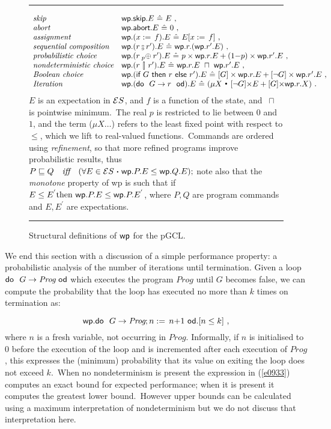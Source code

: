 \documentclass[numbers,copyright,creativecommons]{eptcs}
\newcommand{\Eqn}[1]{(\ref{#1})}
\newenvironment{Fig}{\begin{figure}[h]\small\rule{\textwidth}{.02cm}}{\rule{\textwidth}{.02cm}\end{figure}}
\newcommand{\st}{~{\scriptscriptstyle ^\bullet}~}
\newcommand{\Lift}[1]{[{#1}]}
\newcommand{\define}{~ \hat{=} ~}
\newcommand{\EE}[1]{ {\cal E}{#1}}
\newcommand{\Gets}{:=\,}
\newcommand{\PC}[1]{\mathbin{\makebox[0em]{~}_{#1}\oplus}}
\newcommand{\Ch}{\ [\!] \ }
\newcommand{\Abort}{\mbox{\sf abort}}
\newcommand{\Skip}{\mbox{\sf skip}}
\newcommand{\If}{\mbox{\sf if\ }}
\newcommand{\Thn}{\mbox{\sf \ then\ }}
\newcommand{\Els}{\mbox{\sf \ else\ }}
\newcommand{\Do}{\mbox{\sf do\ }}
\newcommand{\Od}{\mbox{\sf \ od}}
\newcommand{\Wp}{\mbox{\sf wp}}
\newcommand{\DWp}{\mbox{\sf wp}}
\newcommand{\Min}{~\sqcap~}
\newcommand{\pGCL}{\mbox{pGCL}}
\newcommand{\Prog}{\textit{Prog}}
\newcommand{\CompNY}[3]{(#1#2 \Spot #3)}
\newcommand{\Spot}{\mathrel{\mbox{\boldmath$\cdot$}}}
\newcommand{\Ref}{\sqsubseteq}
\newcommand{\Wide}[1]{~~~#1~~~}
\newcommand{\comp}{\mathbin{\raise 0.6ex\hbox{\oalign{\hfil$\scriptscriptstyle
     \mathrm{o}$\hfil\cr\hfil$\scriptscriptstyle\mathrm{9}$\hfil}}}}
\begin{document}
\begin{Fig}{
{\small
\[
\begin{array}{ll}
\textit{skip} &\DWp.\Skip.E \define E~,\\
\textit{abort} & \DWp.\Abort.E \define 0~,\\
\textit{assignment} &\DWp.(x \Gets f).E \define E[x \Gets f]~,\\
\textit{sequential composition} &\DWp.(r\comp r').E \define \DWp.r.(\DWp.r'.E)~,\\
\textit{probabilistic choice} &\DWp.(r \PC p r').E \define p \times \Wp.r.E + ({1} \mathord- p)\times \Wp.r'.E~,\\
\textit{nondeterministic choice} &\DWp.(r \Ch r').E \define  \DWp.r.E \Min \DWp.r'.E~,\\\textit{Boolean choice} &\DWp.(\If G \Thn r \Els r').E \define \Lift{G} \times \DWp.r.E + \Lift{\neg G} \times \DWp.r'.E~,\\
\textit{Iteration} &\DWp.(\Do ~ G \rightarrow r ~ \Od).E \define (\mu X \st  [\neg G]{\times} E +[G]{\times} \DWp.r.X)~.
\end{array}
\]
$E$ is an expectation in $\EE{S}$, and  $f$ is a function of the state,
and $\Min$ is pointwise minimum.\ The real $p$ is restricted to lie between $0$ and $1$, and the term ($\mu X \dots $) refers to the least fixed point with respect to $\leq$, which we lift to real-valued functions.\ Commands are ordered using \emph{refinement}, so that more refined programs
improve probabilistic results, thus $P \Ref Q \Wide{\textit{iff}} \CompNY{\forall}{E \in \EE{S}}{\Wp.P.E \leq \Wp.Q.E};$
note also that the {\it monotone} property of wp is such that if $E \le E^{'}  \mathrm{then} \ {\Wp.P.E \leq \Wp.P.E^{'}}$,
where $P,Q$ are program commands and $E, E^{'}$ are expectations.
}}

\caption{Structural definitions of $\DWp$ for  the $\pGCL$.}\label{f0604}
\end{Fig}






We end this section with a discussion of  a simple performance property: a probabilistic analysis of the number of iterations until termination.  Given a loop $\Do ~ G \rightarrow \Prog \Od$ which executes the program $\Prog$ until $G$ becomes false, we can compute the probability that the loop has executed no more than $k$ times on termination as:

\begin{equation}\label{e0933}
\Wp.\Do ~ G \rightarrow \Prog; n\Gets n{+}1 \Od.[n\leq k]~,
\end{equation}
where $n$ is a fresh variable, not occurring in $\Prog$. Informally, if $n$ is initialised to $0$ before the execution of the loop and is incremented after each execution of $\Prog$, this expresses the (minimum) probability that its value on exiting the loop does not exceed $k$.\ When no nondeterminism is present the expression in \Eqn{e0933} computes an exact bound for expected performance; when it is present it computes the greatest lower bound.\ However upper bounds can be calculated using a maximum interpretation of nondeterminism but we do not discuss that interpretation here.
\end{document}
